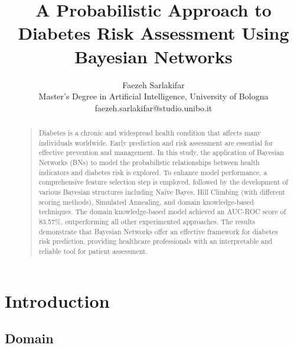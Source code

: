 \documentclass[letterpaper]{article}
\begin{document}
 	
%
\title{A Probabilistic Approach to Diabetes Risk Assessment Using Bayesian Networks}
\author{Faezeh Sarlakifar\\
Master's Degree in Artificial Intelligence, University of Bologna\\
faezeh.sarlakifar@studio.unibo.it
}
\maketitle


\begin{abstract}
\begin{quote}

Diabetes is a chronic and widespread health condition that affects many individuals worldwide. Early prediction and risk assessment are essential for effective prevention and management. In this study, the application of Bayesian Networks (BNs) to model the probabilistic relationships between health indicators and diabetes risk is explored.  To enhance model performance, a comprehensive feature selection step is employed, followed by the development of various Bayesian structures including Naïve Bayes, Hill Climbing (with different scoring methods), Simulated Annealing, and domain knowledge-based techniques. The domain knowledge-based model achieved an AUC-ROC score of 83.57\%, outperforming all other experimented approaches. The results demonstrate that Bayesian Networks offer an effective framework for diabetes risk prediction, providing healthcare professionals with an interpretable and reliable tool for patient assessment.

\end{quote}
\end{abstract}


\section{Introduction}

\subsection{Domain}
\end{document}
